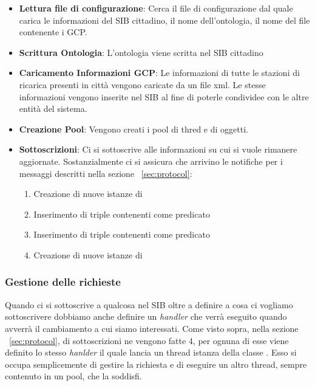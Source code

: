 \begin{itemize}
	\item \textbf{Lettura file di configurazione}: Cerca il file di configurazione  dal quale carica le informazioni del SIB cittadino, il nome dell'ontologia, il nome del file contenente i GCP.
	\item \textbf{Scrittura Ontologia}: L'ontologia viene scritta nel SIB cittadino
	\item \textbf{Caricamento Informazioni GCP}: Le informazioni di tutte le stazioni di ricarica presenti in città vengono caricate da un file xml. Le stesse informazioni vengono inserite nel SIB al fine di poterle condividee con le altre entità del sistema.
	\item \textbf{Creazione Pool}: Vengono creati i pool di thred e di oggetti.
	\item \label{item:subscr} \textbf{Sottoscrizioni}: Ci si sottoscrive alle informazioni su cui si vuole rimanere aggiornate. Sostanzialmente ci si assicura che arrivino le notifiche per i messaggi descritti nella sezione ~\ref{sec:protocol}:
	\begin{enumerate}
		\item Creazione di nuove istanze di 
		\item Inserimento di triple contenenti come predicato 
		\item Inserimento di triple contenenti come predicato 
		\item Creazione di nuove istanze di 
	\end{enumerate}
\end{itemize}

\subsubsection{Gestione delle richieste}

Quando ci si sottoscrive a qualcosa nel SIB oltre a definire a cosa ci vogliamo sottoscrivere dobbiamo anche definire un \emph{handler} che verrà eseguito quando avverrà il cambiamento a cui siamo interessati. Come visto sopra, nella sezione ~\ref{sec:protocol}, di sottoscrizioni ne vengono fatte 4, per ognuna di esse viene definito lo stesso \emph{hanlder} il quale lancia un thread istanza della classe . Esso si occupa semplicemente di gestire la richiesta e di eseguire un altro thread, sempre contenuto in un pool, che la soddisfi.

